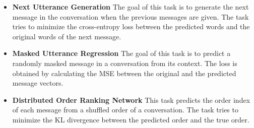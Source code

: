 \documentclass[letterpaper]{article} %
\newcommand{\kibitz}[2]{\ifnum\Comments=1{\textcolor{#1}{#2}}\fi}
\newcommand{\kg}[1]{\kibitz{red}{[KG:#1]}}
\begin{document}
\begin{itemize}
    \item \textbf{Next Utterance Generation}  The goal of this task is to generate the next message in the conversation when the previous messages are given. The task tries to minimize the cross-entropy loss between the predicted words and the original words of the next message.  
  
    \item \textbf{Masked Utterance Regression}  The goal of this task is to predict a randomly masked message in a conversation from its context. The loss is obtained by calculating the MSE between the original and the predicted message vectors.
    
    \item \textbf{Distributed Order Ranking Network} This task predicts the order index of each message from a shuffled order of a conversation. The task tries to minimize the KL divergence between the predicted order and the true order.
\end{itemize}



\end{document}
